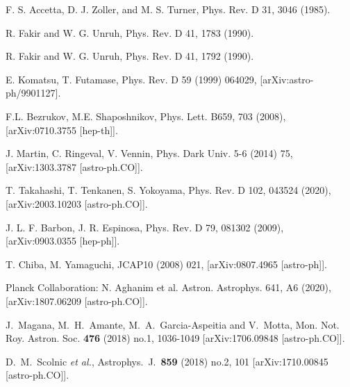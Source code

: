 \documentclass[preprintnumbers,amsmath,amssymb,nofootinbib]{revtex4}
\begin{document}
\begin{thebibliography}{99}
 F. S. Accetta, D. J. Zoller, and M. S. Turner, Phys. Rev. D 31, 3046 (1985).

 R. Fakir and W. G. Unruh, Phys. Rev. D 41, 1783 (1990).

 R. Fakir and W. G. Unruh, Phys. Rev. D 41, 1792 (1990).

 E. Komatsu, T. Futamase, Phys. Rev. D 59 (1999) 064029, 	[arXiv:astro-ph/9901127].


 F.L. Bezrukov, M.E. Shaposhnikov, Phys. Lett. B659, 703 (2008), [arXiv:0710.3755 [hep-th]].

 J. Martin, C. Ringeval, V. Vennin, Phys. Dark Univ. 5-6 (2014) 75, [arXiv:1303.3787 [astro-ph.CO]].


 T. Takahashi, T. Tenkanen, S. Yokoyama, Phys. Rev. D 102, 043524 (2020), [arXiv:2003.10203 [astro-ph.CO]].





 J. L. F. Barbon, J. R. Espinosa, Phys. Rev. D 79, 081302 (2009), [arXiv:0903.0355 [hep-ph]].

 T. Chiba, M. Yamaguchi, JCAP10 (2008) 021, [arXiv:0807.4965 [astro-ph]].

 Planck Collaboration: N. Aghanim et al. %
Astron. Astrophys.  641, A6 (2020), [arXiv:1807.06209 [astro-ph.CO]].


J.~Magana, M.~H.~Amante, M.~A.~Garcia-Aspeitia and V.~Motta,
Mon. Not. Roy. Astron. Soc. \textbf{476} (2018) no.1, 1036-1049
[arXiv:1706.09848 [astro-ph.CO]].

  D.~M.~Scolnic {\it et al.},
  Astrophys.\ J.\  {\bf 859} (2018) no.2,  101
  [arXiv:1710.00845 [astro-ph.CO]].


\end{thebibliography}
\end{document}
